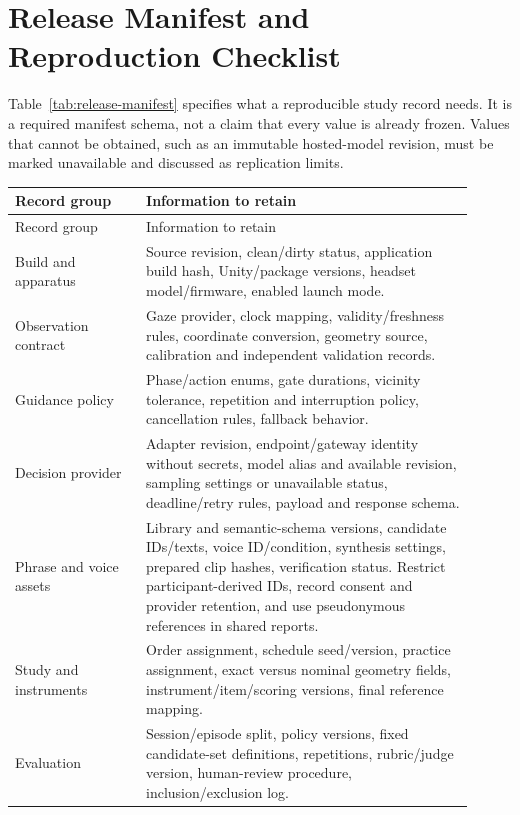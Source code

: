 \clearpage
\section{Release Manifest and Reproduction Checklist}
Table~\ref{tab:release-manifest} specifies what a reproducible study record needs. It is a required manifest schema, not a claim that every value is already frozen. Values that cannot be obtained, such as an immutable hosted-model revision, must be marked unavailable and discussed as replication limits.

\begingroup\small\singlespacing
\begingroup
{}\label{tab:release-manifest}
\begin{longtable}{@{}p{0.26\linewidth}p{0.65\linewidth}@{}}
\toprule
Record group & Information to retain \\\midrule\endfirsthead
\toprule Record group & Information to retain \\\midrule\endhead
Build and apparatus & Source revision, clean/dirty status, application build hash, Unity/package versions, headset model/firmware, enabled launch mode.\\
Observation contract & Gaze provider, clock mapping, validity/freshness rules, coordinate conversion, geometry source, calibration and independent validation records.\\
Guidance policy & Phase/action enums, gate durations, vicinity tolerance, repetition and interruption policy, cancellation rules, fallback behavior.\\
Decision provider & Adapter revision, endpoint/gateway identity without secrets, model alias and available revision, sampling settings or unavailable status, deadline/retry rules, payload and response schema.\\
Phrase and voice assets & Library and semantic-schema versions, candidate IDs/texts, voice ID/condition, synthesis settings, prepared clip hashes, verification status. Restrict participant-derived IDs, record consent and provider retention, and use pseudonymous references in shared reports.\\
Study and instruments & Order assignment, schedule seed/version, practice assignment, exact versus nominal geometry fields, instrument/item/scoring versions, final reference mapping.\\
Evaluation & Session/episode split, policy versions, fixed candidate-set definitions, repetitions, rubric/judge version, human-review procedure, inclusion/exclusion log.\\\bottomrule
\end{longtable}
\endgroup
\endgroup

